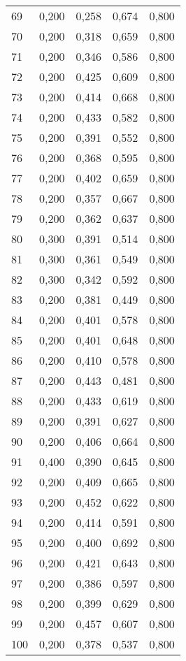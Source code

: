 \begin{longtable}{|l|l|l|l|l|}
        69&0,200&0,258&0,674&0,800\\
        70&0,200&0,318&0,659&0,800\\
        71&0,200&0,346&0,586&0,800\\
        72&0,200&0,425&0,609&0,800\\
        73&0,200&0,414&0,668&0,800\\
        74&0,200&0,433&0,582&0,800\\
        75&0,200&0,391&0,552&0,800\\
        76&0,200&0,368&0,595&0,800\\
        77&0,200&0,402&0,659&0,800\\
        78&0,200&0,357&0,667&0,800\\
        79&0,200&0,362&0,637&0,800\\
        80&0,300&0,391&0,514&0,800\\
        81&0,300&0,361&0,549&0,800\\
        82&0,300&0,342&0,592&0,800\\
        83&0,200&0,381&0,449&0,800\\
        84&0,200&0,401&0,578&0,800\\
        85&0,200&0,401&0,648&0,800\\
        86&0,200&0,410&0,578&0,800\\
        87&0,200&0,443&0,481&0,800\\
        88&0,200&0,433&0,619&0,800\\
        89&0,200&0,391&0,627&0,800\\
        90&0,200&0,406&0,664&0,800\\
        91&0,400&0,390&0,645&0,800\\
        92&0,200&0,409&0,665&0,800\\
        93&0,200&0,452&0,622&0,800\\
        94&0,200&0,414&0,591&0,800\\
        95&0,200&0,400&0,692&0,800\\
        96&0,200&0,421&0,643&0,800\\
        97&0,200&0,386&0,597&0,800\\
        98&0,200&0,399&0,629&0,800\\
        99&0,200&0,457&0,607&0,800\\
        100&0,200&0,378&0,537&0,800\\
\end{longtable}

